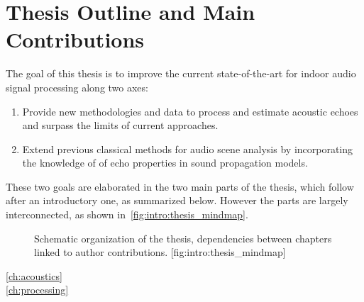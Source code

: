 %



\section{Thesis Outline and Main Contributions}
The goal of this thesis is to improve the current state-of-the-art for indoor audio signal processing along two axes:
\begin{enumerate}
    \item Provide new methodologies and data to process and estimate acoustic echoes and surpass the limits of current approaches.
    \item Extend previous classical methods for audio scene analysis by incorporating the knowledge of of echo properties in sound propagation models.
\end{enumerate}
These two goals are elaborated in the two main parts of the thesis, which follow after an introductory one, as summarized below.
However the parts are largely interconnected, as shown in~\cref{fig:intro:thesis_mindmap}.

\begin{figure}[t]
    \begin{sidecaption}{%
        Schematic organization of the thesis, dependencies between chapters linked to author contributions.
    }[fig:intro:thesis_mindmap]
    \centering
    \resizebox{\linewidth}{!}{
        
    }
    \end{sidecaption}
\end{figure}


\begin{description}
    \item[\cref{ch:acoustics}]\synopsisChAcoustics
    \item[\cref{ch:processing}]\synopsisChProcessing
\end{description}

